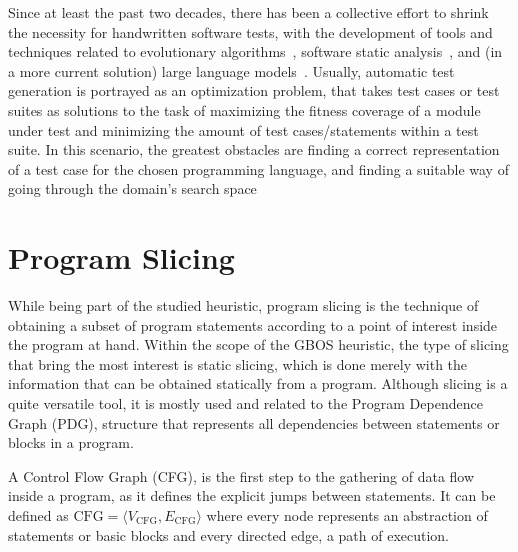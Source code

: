 \documentclass[%
  chapterprefix=false,%
  open=right,%
  twoside=true,%
  paper=a4,%
  logofile={Figures/logo.png},%
  thesistype=master,%
  UKenglish,%
]{se2thesis}
\begin{document}
Since at least the past two decades, there has been a collective effort to shrink the necessity for handwritten software tests, with the development of tools and techniques related to evolutionary algorithms~\cite{DBLP:conf/sigsoft/FraserA11}, software static analysis~\cite{DBLP:conf/osdi/CadarDE08}, and (in a more current solution) large language models~\cite{DBLP:journals/corr/abs-2207-10397}.
Usually, automatic test generation is portrayed as an optimization problem, that takes test cases or test suites as solutions to the task of maximizing the fitness coverage of a module under test and minimizing the amount of test cases/statements within a test suite.
In this scenario, the greatest obstacles are finding a correct representation of a test case for the chosen programming language, and finding a suitable way of going through the domain's search space 

\newpage

\section{Program Slicing}\label{sec:slicing}

While being part of the studied heuristic, program slicing is the technique of obtaining a subset of program statements according to a point of interest inside the program at hand.
Within the scope of the GBOS heuristic, the type of slicing that bring the most interest is static slicing, which is done merely with the information that can be obtained statically from a program.
Although slicing is a quite versatile tool, it is mostly used and related to the Program Dependence Graph (PDG), structure that represents all dependencies between statements or blocks in a program.

A Control Flow Graph (CFG), is the first step to the gathering of data flow inside a program, as it defines the explicit jumps between statements.
It can be defined as \(\text{CFG} = \langle V_{\text{CFG}}, E_{\text{CFG}} \rangle\) where every node represents an abstraction of statements or basic blocks and every directed edge, a path of execution.
\end{document}
